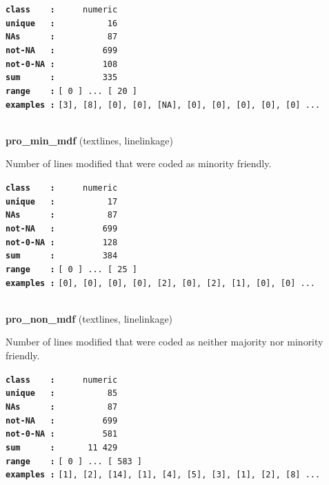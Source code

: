 \documentclass[]{article}
\begin{document}
\textbf{\texttt{class\ \ \ \ :}} \texttt{~~~~~numeric}\\
\textbf{\texttt{unique\ \ \ :}} \texttt{~~~~~~~~~~16}\\
\textbf{\texttt{NAs\ \ \ \ \ \ :}} \texttt{~~~~~~~~~~87}\\
\textbf{\texttt{not-NA\ \ \ :}} \texttt{~~~~~~~~~699}\\
\textbf{\texttt{not-0-NA\ :}} \texttt{~~~~~~~~~108}\\
\textbf{\texttt{sum\ \ \ \ \ \ :}} \texttt{~~~~~~~~~335}\\
\textbf{\texttt{range\ \ \ \ :}}
\texttt{{[}\ 0\ {]}\ ...\ {[}\ 20\ {]}}\\
\textbf{\texttt{examples\ :}}
\texttt{{[}3{]},\ {[}8{]},\ {[}0{]},\ {[}0{]},\ {[}NA{]},\ {[}0{]},\ {[}0{]},\ {[}0{]},\ {[}0{]},\ {[}0{]}\ ...}\\

~

\textbf{pro\_min\_mdf} (textlines, linelinkage)

Number of lines modified that were coded as minority friendly.

\textbf{\texttt{class\ \ \ \ :}} \texttt{~~~~~numeric}\\
\textbf{\texttt{unique\ \ \ :}} \texttt{~~~~~~~~~~17}\\
\textbf{\texttt{NAs\ \ \ \ \ \ :}} \texttt{~~~~~~~~~~87}\\
\textbf{\texttt{not-NA\ \ \ :}} \texttt{~~~~~~~~~699}\\
\textbf{\texttt{not-0-NA\ :}} \texttt{~~~~~~~~~128}\\
\textbf{\texttt{sum\ \ \ \ \ \ :}} \texttt{~~~~~~~~~384}\\
\textbf{\texttt{range\ \ \ \ :}}
\texttt{{[}\ 0\ {]}\ ...\ {[}\ 25\ {]}}\\
\textbf{\texttt{examples\ :}}
\texttt{{[}0{]},\ {[}0{]},\ {[}0{]},\ {[}0{]},\ {[}2{]},\ {[}0{]},\ {[}2{]},\ {[}1{]},\ {[}0{]},\ {[}0{]}\ ...}\\

~

\textbf{pro\_non\_mdf} (textlines, linelinkage)

Number of lines modified that were coded as neither majority nor
minority friendly.

\textbf{\texttt{class\ \ \ \ :}} \texttt{~~~~~numeric}\\
\textbf{\texttt{unique\ \ \ :}} \texttt{~~~~~~~~~~85}\\
\textbf{\texttt{NAs\ \ \ \ \ \ :}} \texttt{~~~~~~~~~~87}\\
\textbf{\texttt{not-NA\ \ \ :}} \texttt{~~~~~~~~~699}\\
\textbf{\texttt{not-0-NA\ :}} \texttt{~~~~~~~~~581}\\
\textbf{\texttt{sum\ \ \ \ \ \ :}} \texttt{~~~~~~11~429}\\
\textbf{\texttt{range\ \ \ \ :}}
\texttt{{[}\ 0\ {]}\ ...\ {[}\ 583\ {]}}\\
\textbf{\texttt{examples\ :}}
\texttt{{[}1{]},\ {[}2{]},\ {[}14{]},\ {[}1{]},\ {[}4{]},\ {[}5{]},\ {[}3{]},\ {[}1{]},\ {[}2{]},\ {[}8{]}\ ...}\\
\end{document}
